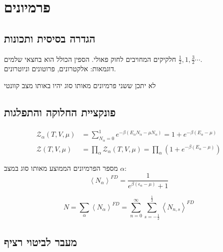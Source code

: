 \section{פרמיונים}

\subsection{הגדרה בסיסית ותכונות}
חלקיקים המחויבים לחוק פאולי. הספין הכולל הוא בחצאי שלמים $\tfrac{1}{2},1,\tfrac{3}{2}\cdots$. \\
דוגמאות: אלקטרונים, פרוטונים וניוטרונים.

\begin{cheatformula}
לא יתכן ששני פרמיונים מאותו סוג יהיו באותו מצב קוונטי
\end{cheatformula}

\subsection{פונקציית החלוקה והתפלגות}

\begin{cheatformula}
    \begin{align*}
    \mathcal{Z}_\alpha \left(T,V,\mu\right) &= \sum_{N_\alpha = 0}^1 e^{-\beta \left( E_\alpha N_\alpha - \mu N_\alpha \right)} = 1 + e^{-\beta \left( E_\alpha - \mu \right)} \\
    \mathcal{Z} \left(T,V,\mu\right) &= \prod_\alpha \mathcal{Z}_\alpha \left(T,V,\mu\right) = \prod_\alpha \left( 1 + e^{-\beta \left( E_\alpha - \mu \right)} \right)
    \end{align*}
\end{cheatformula}

\begin{cheatformula}
מספר הפרמיונים הממוצע מאותו סוג במצב $\alpha$:
    $$\left<N_\alpha \right>^{FD} = \frac{1}{e^{\beta \left(\epsilon_\alpha -\mu \right) }+1}$$
\end{cheatformula}

\begin{cheatformula}
$$N = \sum_\alpha \left< N_\alpha \right>^{FD} = \sum_{n=0}^{\infty} \sum_{s=-\frac{1}{2}}^{\frac{1}{2}} \left< N_{n,s} \right>^{FD}$$
\end{cheatformula}

\subsection{מעבר לביטוי רציף}

